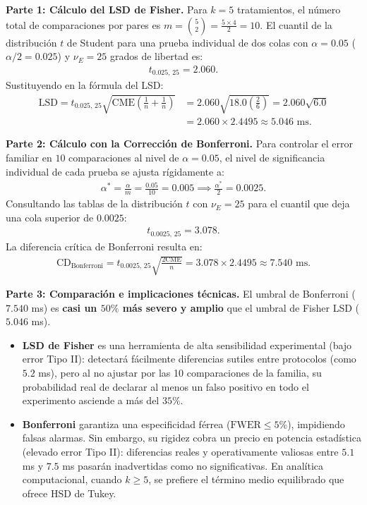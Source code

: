 \begin{solproblema}
	\textbf{Parte 1: Cálculo del LSD de Fisher.}
	Para $k = 5$ tratamientos, el número total de comparaciones por pares es $m = \binom{5}{2} = \frac{5 \times 4}{2} = 10$.
	El cuantil de la distribución $t$ de Student para una prueba individual de dos colas con $\alpha = 0.05$ ($\alpha/2 = 0.025$) y $\nu_E = 25$ grados de libertad es:
	\begin{align}
		t_{0.025, \, 25} = 2.060.
	\end{align}
	Sustituyendo en la fórmula del LSD:
	\begin{align}
		\text{LSD} = t_{0.025, \, 25} \sqrt{\text{CME} \left( \frac{1}{n} + \frac{1}{n} \right)} &= 2.060 \sqrt{18.0 \left( \frac{2}{6} \right)} = 2.060 \sqrt{6.0} \\
		&= 2.060 \times 2.4495 \approx 5.046 \text{ ms}.
	\end{align}
	
	\textbf{Parte 2: Cálculo con la Corrección de Bonferroni.}
	Para controlar el error familiar en $10$ comparaciones al nivel de $\alpha = 0.05$, el nivel de significancia individual de cada prueba se ajusta rígidamente a:
	\begin{align}
		\alpha^* = \frac{\alpha}{m} = \frac{0.05}{10} = 0.005 \implies \frac{\alpha^*}{2} = 0.0025.
	\end{align}
	Consultando las tablas de la distribución $t$ con $\nu_E = 25$ para el cuantil que deja una cola superior de $0.0025$:
	\begin{align}
		t_{0.0025, \, 25} = 3.078.
	\end{align}
	La diferencia crítica de Bonferroni resulta en:
	\begin{align}
		\text{CD}_{\text{Bonferroni}} = t_{0.0025, \, 25} \sqrt{\frac{2 \text{CME}}{n}} = 3.078 \times 2.4495 \approx 7.540 \text{ ms}.
	\end{align}
	
	\textbf{Parte 3: Comparación e implicaciones técnicas.}
	El umbral de Bonferroni ($7.540$ ms) es \textbf{casi un $50\%$ más severo y amplio} que el umbral de Fisher LSD ($5.046$ ms). 
	\begin{itemize}
		\item \textbf{LSD de Fisher} es una herramienta de alta sensibilidad experimental (bajo error Tipo II): detectará fácilmente diferencias sutiles entre protocolos (como $5.2$ ms), pero al no ajustar por las 10 comparaciones de la familia, su probabilidad real de declarar al menos un falso positivo en todo el experimento asciende a más del $35\%$.
		\item \textbf{Bonferroni} garantiza una especificidad férrea ($\text{FWER} \leq 5\%$), impidiendo falsas alarmas. Sin embargo, su rigidez cobra un precio en potencia estadística (elevado error Tipo II): diferencias reales y operativamente valiosas entre $5.1$ ms y $7.5$ ms pasarán inadvertidas como no significativas. En analítica computacional, cuando $k \geq 5$, se prefiere el término medio equilibrado que ofrece HSD de Tukey.
	\end{itemize}
\end{solproblema}

